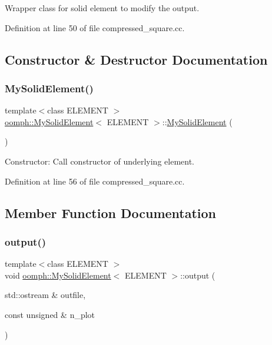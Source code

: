 Wrapper class for solid element to modify the output. 

Definition at line 50 of file compressed\+\_\+square.\+cc.



\subsection{Constructor \& Destructor Documentation}
\mbox{\label{classoomph_1_1MySolidElement_afe8a392ac0bed5890f64b75adea8f5af}} 
\subsubsection{\texorpdfstring{My\+Solid\+Element()}{MySolidElement()}}
{\footnotesize\ttfamily template$<$class E\+L\+E\+M\+E\+NT $>$ \\
\hyperlink{classoomph_1_1MySolidElement}{oomph\+::\+My\+Solid\+Element}$<$ E\+L\+E\+M\+E\+NT $>$\+::\hyperlink{classoomph_1_1MySolidElement}{My\+Solid\+Element} (\begin{DoxyParamCaption}{ }\end{DoxyParamCaption})\hspace{0.3cm}{\ttfamily [inline]}}



Constructor\+: Call constructor of underlying element. 



Definition at line 56 of file compressed\+\_\+square.\+cc.



\subsection{Member Function Documentation}
\mbox{\label{classoomph_1_1MySolidElement_abf5b903419201b1fd6f1587749337650}} 
\subsubsection{\texorpdfstring{output()}{output()}}
{\footnotesize\ttfamily template$<$class E\+L\+E\+M\+E\+NT $>$ \\
void \hyperlink{classoomph_1_1MySolidElement}{oomph\+::\+My\+Solid\+Element}$<$ E\+L\+E\+M\+E\+NT $>$\+::output (\begin{DoxyParamCaption}\item[{std\+::ostream \&}]{outfile,  }\item[{const unsigned \&}]{n\+\_\+plot }\end{DoxyParamCaption})\hspace{0.3cm}{\ttfamily [inline]}}



